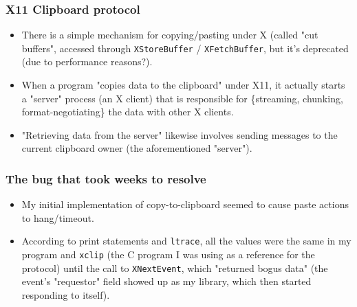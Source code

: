 \documentclass{beamer}
\begin{document}
\begin{frame}[fragile]
\frametitle{X11 Clipboard protocol}
\begin{itemize}
\item
There is a simple mechanism for copying/pasting under X (called "cut buffers", accessed through \verb|XStoreBuffer| / \verb|XFetchBuffer|, but it's deprecated (due to performance reasons?).
\item
When a program "copies data to the clipboard" under X11, it actually starts a "server" process (an X client) that is responsible for \{streaming, chunking, format-negotiating\} the data with other X clients.
\item
"Retrieving data from the server" likewise involves sending messages to the current clipboard owner (the aforementioned "server").
\end{itemize}
\end{frame}

\begin{frame}[fragile]
\frametitle{The bug that took weeks to resolve}
\begin{itemize}
\item
My initial implementation of copy-to-clipboard seemed to cause paste actions to hang/timeout.
\item
According to print statements and \verb|ltrace|, all the values were the same in my program and \verb|xclip| (the C program I was using as a reference for the protocol) until the call to \verb|XNextEvent|, which "returned bogus data" (the event's "requestor" field showed up as my library, which then started responding to itself).
\end{itemize}
\end{frame}
\end{document}
